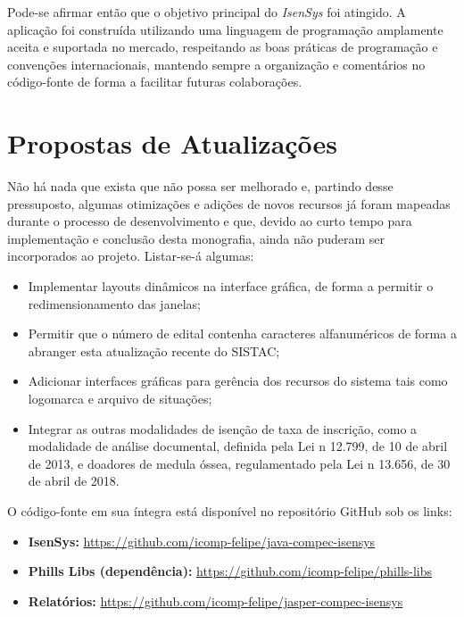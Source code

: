 \documentclass[
	12pt,			%
	openright,		%
	oneside,	
	a4paper,		%
	english,		%
	brazil			%
]{abntex2/abntex2}  %
\begin{document}
			Pode-se afirmar então que o objetivo principal do \textit{IsenSys} foi atingido. A aplicação foi construída utilizando uma linguagem de programação amplamente aceita e suportada no mercado, respeitando as boas práticas de programação e convenções internacionais, mantendo sempre a organização e comentários no código-fonte de forma a facilitar futuras colaborações.
	
		\section{Propostas de Atualizações}
		
			Não há nada que exista que não possa ser melhorado e, partindo desse pressuposto, algumas otimizações e adições de novos recursos já foram mapeadas durante o processo de desenvolvimento e que, devido ao curto tempo para implementação e conclusão desta monografia, ainda não puderam ser incorporados ao projeto. Listar-se-á algumas:
			
			\begin{itemize}
				
				\item Implementar layouts dinâmicos na interface gráfica, de forma a permitir o redimensionamento das janelas;
				\item Permitir que o número de edital contenha caracteres alfanuméricos de forma a abranger esta atualização recente do SISTAC;
				\item Adicionar interfaces gráficas para gerência dos recursos do sistema tais como logomarca e arquivo de situações;
				\item Integrar as outras modalidades de isenção de taxa de inscrição, como a modalidade de análise documental, definida pela Lei n{\textdegree} 12.799, de 10 de abril de 2013, e doadores de medula óssea, regulamentado pela Lei n{\textdegree} 13.656, de 30 de abril de 2018.
				
			\end{itemize}
			
			O código-fonte em sua íntegra está disponível no repositório GitHub sob os links:
			
			\begin{itemize}
				
				\item \textbf{IsenSys:} \url{https://github.com/icomp-felipe/java-compec-isensys}
				\item \textbf{Phills Libs (dependência):} \url{https://github.com/icomp-felipe/phills-libs}
				\item \textbf{Relatórios:} \url{https://github.com/icomp-felipe/jasper-compec-isensys}
				
			\end{itemize}
\end{document}
